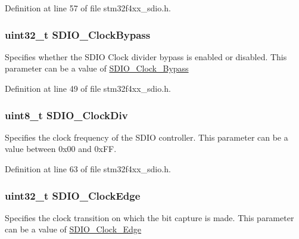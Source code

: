 Definition at line 57 of file stm32f4xx\-\_\-sdio.\-h.

\hypertarget{struct_s_d_i_o___init_type_def_a30c395781536ad414f2dba26b1ad1e72}{
\subsubsection[{S\-D\-I\-O\-\_\-\-Clock\-Bypass}]{\setlength{\rightskip}{0pt plus 5cm}uint32\-\_\-t S\-D\-I\-O\-\_\-\-Clock\-Bypass}}\label{struct_s_d_i_o___init_type_def_a30c395781536ad414f2dba26b1ad1e72}
Specifies whether the S\-D\-I\-O Clock divider bypass is enabled or disabled. This parameter can be a value of \hyperlink{group___s_d_i_o___clock___bypass}{S\-D\-I\-O\-\_\-\-Clock\-\_\-\-Bypass} 

Definition at line 49 of file stm32f4xx\-\_\-sdio.\-h.

\hypertarget{struct_s_d_i_o___init_type_def_a9f37419ca4d1fa1d39f93c12c2b2e91b}{
\subsubsection[{S\-D\-I\-O\-\_\-\-Clock\-Div}]{\setlength{\rightskip}{0pt plus 5cm}uint8\-\_\-t S\-D\-I\-O\-\_\-\-Clock\-Div}}\label{struct_s_d_i_o___init_type_def_a9f37419ca4d1fa1d39f93c12c2b2e91b}
Specifies the clock frequency of the S\-D\-I\-O controller. This parameter can be a value between 0x00 and 0x\-F\-F. 

Definition at line 63 of file stm32f4xx\-\_\-sdio.\-h.

\hypertarget{struct_s_d_i_o___init_type_def_a9005baa5fb30fb068fbdbbf8856c651e}{
\subsubsection[{S\-D\-I\-O\-\_\-\-Clock\-Edge}]{\setlength{\rightskip}{0pt plus 5cm}uint32\-\_\-t S\-D\-I\-O\-\_\-\-Clock\-Edge}}\label{struct_s_d_i_o___init_type_def_a9005baa5fb30fb068fbdbbf8856c651e}
Specifies the clock transition on which the bit capture is made. This parameter can be a value of \hyperlink{group___s_d_i_o___clock___edge}{S\-D\-I\-O\-\_\-\-Clock\-\_\-\-Edge} 


